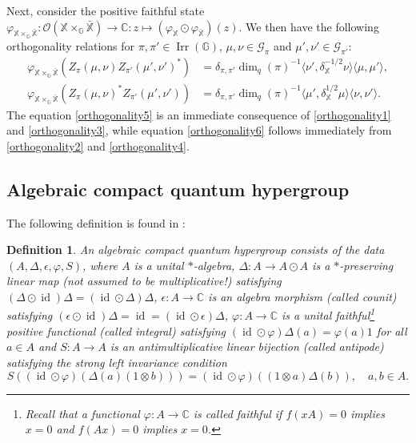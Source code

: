 \documentclass[reqno]{amsart}
\numberwithin{equation}{section}
\newtheorem{Def}[Theorem]{Definition}
\newcommand\XGX{\X\times_\G \bar{\X}}
\DeclareMathOperator{\id}{\mathrm{id}}
\DeclareMathOperator{\Irr}{\mathrm{Irr}}
\newcommand{\mcG}{\mathcal{G}}
\newcommand{\mcO}{\mathcal{O}}
\newcommand{\C}{\mathbb{C}}
\newcommand{\G}{\mathbb{G}}
\newcommand{\X}{\mathbb{X}}
\begin{document}
Next, consider the positive faithful state
$\varphi_{\XGX}: \mcO(\XGX)\to \C: z \mapsto (\varphi_\X \odot \varphi_{\bar{\X}})(z).$
We then have the following orthogonality relations for $\pi, \pi' \in \Irr(\G)$, $\mu,\nu \in \mcG_\pi$ and $\mu', \nu'\in \mcG_{\pi'}$: 
    \begin{align}
        \label{orthogonality5}\varphi_{\XGX}(Z_\pi(\mu, \nu)Z_{\pi'}(\mu', \nu')^*)&= \delta_{\pi, \pi'}\dim_q(\pi)^{-1}\langle \nu', \delta_\X^{-1/2}\nu\rangle\langle \mu, \mu'\rangle,\\
        \label{orthogonality6} \varphi_{\XGX}(Z_\pi(\mu, \nu)^*Z_{\pi'}(\mu', \nu')) &= \delta_{\pi, \pi'}\dim_q(\pi)^{-1}\langle \mu', \delta_\X^{1/2}\mu\rangle\langle \nu, \nu' \rangle.
    \end{align}
The equation \eqref{orthogonality5} is an immediate consequence of \eqref{orthogonality1} and \eqref{orthogonality3}, while equation \eqref{orthogonality6} follows immediately from \eqref{orthogonality2} and \eqref{orthogonality4}. 

\subsection{Algebraic compact quantum hypergroup}

The following definition is found in \cite{DVD11a}:

\begin{Def} \label{compacthyperdef}
    An \emph{algebraic compact quantum hypergroup} consists of the data $(A, \Delta, \epsilon, \varphi, S)$, where $A$ is a unital $*$-algebra, $\Delta: A \to A\odot A$ is a $*$-preserving linear map (not assumed to be multiplicative!) satisfying $(\Delta \odot \id)\Delta = (\id \odot \Delta)\Delta$, $\epsilon: A \to \C$ is an algebra morphism (called counit)  satisfying $(\epsilon\odot \id)\Delta= \id = (\id \odot \epsilon)\Delta$, $\varphi: A\to \C$ is a unital faithful\footnote{Recall that a functional $\varphi: A \to \C$ is called faithful if $f(xA)= 0$ implies $x= 0$ and $f(Ax)= 0$ implies $x= 0$.} positive functional (called integral) satisfying $(\id \odot \varphi)\Delta(a)= \varphi(a)1$ for all $a\in A$ and $S: A \to A$ is an antimultiplicative linear bijection (called antipode) satisfying the strong left invariance condition
    $$S((\id \odot \varphi)(\Delta(a)(1\otimes b)))= (\id \odot \varphi)((1\otimes a)\Delta(b)), \quad a,b\in A.$$
\end{Def}
\end{document}
